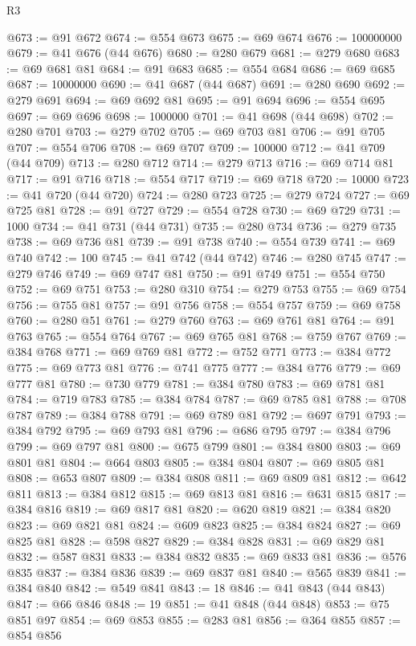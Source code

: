 \begin{lexlean}{R3}
\begin{coremodule}
@673 := @91 @672
@674 := @554 @673
@675 := @69 @674
@676 := 100000000
@679 := @41 @676 (@44 @676)
@680 := @280 @679
@681 := @279 @680
@683 := @69 @681 @81
@684 := @91 @683
@685 := @554 @684
@686 := @69 @685
@687 := 10000000
@690 := @41 @687 (@44 @687)
@691 := @280 @690
@692 := @279 @691
@694 := @69 @692 @81
@695 := @91 @694
@696 := @554 @695
@697 := @69 @696
@698 := 1000000
@701 := @41 @698 (@44 @698)
@702 := @280 @701
@703 := @279 @702
@705 := @69 @703 @81
@706 := @91 @705
@707 := @554 @706
@708 := @69 @707
@709 := 100000
@712 := @41 @709 (@44 @709)
@713 := @280 @712
@714 := @279 @713
@716 := @69 @714 @81
@717 := @91 @716
@718 := @554 @717
@719 := @69 @718
@720 := 10000
@723 := @41 @720 (@44 @720)
@724 := @280 @723
@725 := @279 @724
@727 := @69 @725 @81
@728 := @91 @727
@729 := @554 @728
@730 := @69 @729
@731 := 1000
@734 := @41 @731 (@44 @731)
@735 := @280 @734
@736 := @279 @735
@738 := @69 @736 @81
@739 := @91 @738
@740 := @554 @739
@741 := @69 @740
@742 := 100
@745 := @41 @742 (@44 @742)
@746 := @280 @745
@747 := @279 @746
@749 := @69 @747 @81
@750 := @91 @749
@751 := @554 @750
@752 := @69 @751
@753 := @280 @310
@754 := @279 @753
@755 := @69 @754
@756 := @755 @81
@757 := @91 @756
@758 := @554 @757
@759 := @69 @758
@760 := @280 @51
@761 := @279 @760
@763 := @69 @761 @81
@764 := @91 @763
@765 := @554 @764
@767 := @69 @765 @81
@768 := @759 @767
@769 := @384 @768
@771 := @69 @769 @81
@772 := @752 @771
@773 := @384 @772
@775 := @69 @773 @81
@776 := @741 @775
@777 := @384 @776
@779 := @69 @777 @81
@780 := @730 @779
@781 := @384 @780
@783 := @69 @781 @81
@784 := @719 @783
@785 := @384 @784
@787 := @69 @785 @81
@788 := @708 @787
@789 := @384 @788
@791 := @69 @789 @81
@792 := @697 @791
@793 := @384 @792
@795 := @69 @793 @81
@796 := @686 @795
@797 := @384 @796
@799 := @69 @797 @81
@800 := @675 @799
@801 := @384 @800
@803 := @69 @801 @81
@804 := @664 @803
@805 := @384 @804
@807 := @69 @805 @81
@808 := @653 @807
@809 := @384 @808
@811 := @69 @809 @81
@812 := @642 @811
@813 := @384 @812
@815 := @69 @813 @81
@816 := @631 @815
@817 := @384 @816
@819 := @69 @817 @81
@820 := @620 @819
@821 := @384 @820
@823 := @69 @821 @81
@824 := @609 @823
@825 := @384 @824
@827 := @69 @825 @81
@828 := @598 @827
@829 := @384 @828
@831 := @69 @829 @81
@832 := @587 @831
@833 := @384 @832
@835 := @69 @833 @81
@836 := @576 @835
@837 := @384 @836
@839 := @69 @837 @81
@840 := @565 @839
@841 := @384 @840
@842 := @549 @841
@843 := 18
@846 := @41 @843 (@44 @843)
@847 := @66 @846
@848 := 19
@851 := @41 @848 (@44 @848)
@853 := @75 @851 @97
@854 := @69 @853
@855 := @283 @81
@856 := @364 @855
@857 := @854 @856

\end{coremodule}
\end{lexlean}
